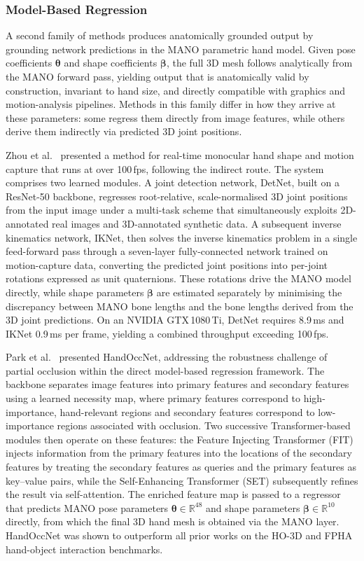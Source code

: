 \subsubsection{Model-Based Regression}\label{subsubsec:model-based}

A second family of methods produces anatomically grounded output by grounding
network predictions in the MANO parametric hand model.
Given pose coefficients $\boldsymbol{\theta}$ and shape coefficients
$\boldsymbol{\beta}$, the full 3D mesh follows analytically from the MANO forward
pass, yielding output that is anatomically valid by construction, invariant to
hand size, and directly compatible with graphics and motion-analysis pipelines.
Methods in this family differ in how they arrive at these parameters: some regress
them directly from image features, while others derive them indirectly via
predicted 3D joint positions.

Zhou et al.\ \cite{zhou2020monocular} presented a method for real-time monocular
hand shape and motion capture that runs at over 100\,fps, following the indirect
route.
The system comprises two learned modules.
A joint detection network, DetNet, built on a ResNet-50 backbone, regresses
root-relative, scale-normalised 3D joint positions from the input image under a
multi-task scheme that simultaneously exploits 2D-annotated real images and
3D-annotated synthetic data.
A subsequent inverse kinematics network, IKNet, then solves the inverse kinematics
problem in a single feed-forward pass through a seven-layer fully-connected
network trained on motion-capture data, converting the predicted joint positions
into per-joint rotations expressed as unit quaternions.
These rotations drive the MANO model directly, while shape parameters
$\boldsymbol{\beta}$ are estimated separately by minimising the discrepancy
between MANO bone lengths and the bone lengths derived from the 3D joint
predictions.
On an NVIDIA GTX\,1080\,Ti, DetNet requires 8.9\,ms and IKNet 0.9\,ms per
frame, yielding a combined throughput exceeding 100\,fps.

Park et al.\ \cite{park2022handoccnet} presented HandOccNet, addressing the
robustness challenge of partial occlusion within the direct model-based regression
framework.
The backbone separates image features into primary features and secondary features
using a learned necessity map, where primary features correspond to
high-importance, hand-relevant regions and secondary features correspond to
low-importance regions associated with occlusion.
Two successive Transformer-based modules then operate on these features: the
Feature Injecting Transformer (FIT) injects information from the primary features
into the locations of the secondary features by treating the secondary features as
queries and the primary features as key--value pairs, while the Self-Enhancing
Transformer (SET) subsequently refines the result via self-attention.
The enriched feature map is passed to a regressor that predicts MANO pose
parameters $\boldsymbol{\theta} \in \mathbb{R}^{48}$ and shape parameters
$\boldsymbol{\beta} \in \mathbb{R}^{10}$ directly, from which the final 3D hand
mesh is obtained via the MANO layer.
HandOccNet was shown to outperform all prior works on the HO-3D and FPHA
hand-object interaction benchmarks.

